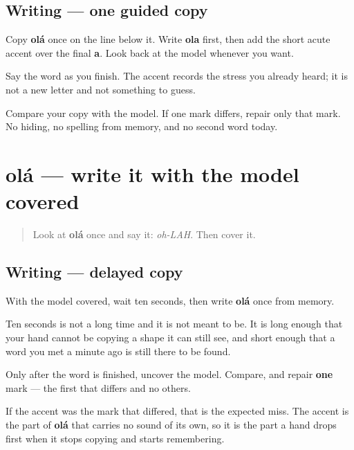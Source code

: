 \subsection*{Writing — one guided copy}

Copy \textbf{olá} once on the line below it. Write \textbf{ola} first, then add the short acute accent over the final \textbf{a}. Look back at the model whenever you want.

Say the word as you finish. The accent records the stress you already heard; it is not a new letter and not something to guess.

\begin{tcolorbox}[breakable,colback=teal!4,colframe=teal!35!black,title={Before you move on}]
Compare your copy with the model. If one mark differs, repair only that mark. No hiding, no spelling from memory, and no second word today.
\end{tcolorbox}
\section[olá]{olá — write it with the model covered}

\label{lesson:PT-W01-ola-delayed-copy}



\begin{quote}
Look at \textbf{olá} once and say it: \emph{oh-LAH}. Then cover it.
\end{quote}

\subsection*{Writing — delayed copy}

With the model covered, wait ten seconds, then write \textbf{olá} once from memory.

Ten seconds is not a long time and it is not meant to be. It is long enough that your hand cannot be copying a shape it can still see, and short enough that a word you met a minute ago is still there to be found.

Only after the word is finished, uncover the model. Compare, and repair \textbf{one} mark — the first that differs and no others.

\begin{tcolorbox}[breakable,colback=teal!4,colframe=teal!35!black,title={Before you move on}]
If the accent was the mark that differed, that is the expected miss. The accent is the part of \textbf{olá} that carries no sound of its own, so it is the part a hand drops first when it stops copying and starts remembering.
\end{tcolorbox}
